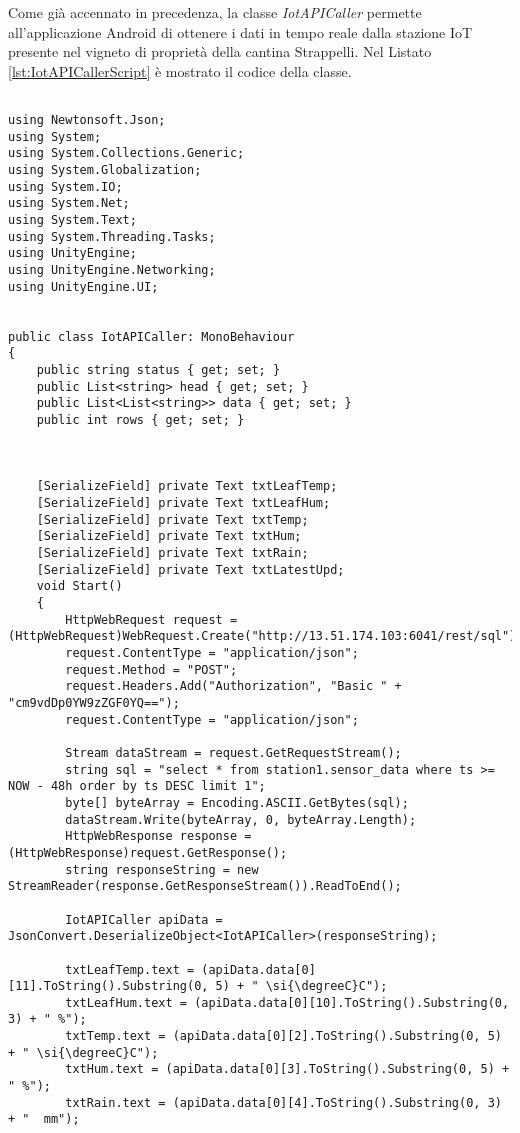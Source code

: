 Come già accennato in precedenza, la classe \textit{IotAPICaller} permette all'applicazione Android di ottenere i dati in tempo reale dalla stazione IoT presente nel vigneto di proprietà della cantina Strappelli. Nel Listato \ref{lst:IotAPICallerScript} è mostrato il codice della classe.

\begin{lstlisting}[caption=Codice sorgente dello script \textit{IotAPICaller}, label=lst:IotAPICallerScript, captionpos=b, basicstyle=\scriptsize]

using Newtonsoft.Json;
using System;
using System.Collections.Generic;
using System.Globalization;
using System.IO;
using System.Net;
using System.Text;
using System.Threading.Tasks;
using UnityEngine;
using UnityEngine.Networking;
using UnityEngine.UI;


public class IotAPICaller: MonoBehaviour
{
    public string status { get; set; }
    public List<string> head { get; set; }
    public List<List<string>> data { get; set; }
    public int rows { get; set; }

    

    [SerializeField] private Text txtLeafTemp;
    [SerializeField] private Text txtLeafHum;
    [SerializeField] private Text txtTemp;
    [SerializeField] private Text txtHum;
    [SerializeField] private Text txtRain;
    [SerializeField] private Text txtLatestUpd;
    void Start()
    {       
        HttpWebRequest request = (HttpWebRequest)WebRequest.Create("http://13.51.174.103:6041/rest/sql");
        request.ContentType = "application/json";
        request.Method = "POST";
        request.Headers.Add("Authorization", "Basic " + "cm9vdDp0YW9zZGF0YQ==");
        request.ContentType = "application/json";        
        
        Stream dataStream = request.GetRequestStream();
        string sql = "select * from station1.sensor_data where ts >= NOW - 48h order by ts DESC limit 1";
        byte[] byteArray = Encoding.ASCII.GetBytes(sql);
        dataStream.Write(byteArray, 0, byteArray.Length);
        HttpWebResponse response = (HttpWebResponse)request.GetResponse();
        string responseString = new StreamReader(response.GetResponseStream()).ReadToEnd();
        
        IotAPICaller apiData = JsonConvert.DeserializeObject<IotAPICaller>(responseString);
        
        txtLeafTemp.text = (apiData.data[0][11].ToString().Substring(0, 5) + " \si{\degreeC}C");
        txtLeafHum.text = (apiData.data[0][10].ToString().Substring(0, 3) + " %");
        txtTemp.text = (apiData.data[0][2].ToString().Substring(0, 5) + " \si{\degreeC}C");
        txtHum.text = (apiData.data[0][3].ToString().Substring(0, 5) + " %");
        txtRain.text = (apiData.data[0][4].ToString().Substring(0, 3) + "  mm");
        

\end{lstlisting}
